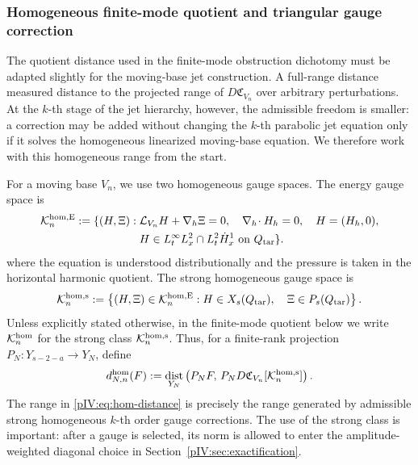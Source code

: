 \documentclass[11pt]{article}
\numberwithin{equation}{section}
\theoremstyle{plain}
\theoremstyle{definition}
\theoremstyle{remark}
\DeclareMathOperator{\dist}{dist}
\newcommand{\nabh}{\nabla_h}
\newcommand{\divh}{\nabla_h\!\cdot}
\newcommand{\calC}{\mathfrak C}
\newcommand{\calK}{\mathcal K}
\begin{document}
\subsubsection{Homogeneous finite-mode quotient and triangular gauge correction}
\label{pIV:subsec:homogeneous-range-gauge}

The quotient distance used in the finite-mode obstruction dichotomy must be adapted
slightly for the moving-base jet construction.  A full-range distance measured distance to
the projected range of \(D\calC_{V_n}\) over arbitrary perturbations.  At the
\(k\)-th stage of the jet hierarchy, however, the admissible freedom is smaller: a
correction may be added without changing the \(k\)-th parabolic jet equation only if
it solves the homogeneous linearized moving-base equation.  We therefore work with
this homogeneous range from the start.

For a moving base \(V_n\), we use two homogeneous gauge spaces.  The energy gauge
space is
\begin{equation}\label{pIV:eq:hom-gauge-energy-space}
\begin{aligned}
        \calK^{\rm hom,E}_n
        :=
        \{(H,\Xi):\;&
        \mathcal L_{V_n}H+\nabh\Xi=0,
        \quad \divh H_h=0,
        \quad H=(H_h,0),\\
        &H\in L^\infty_tL^2_x\cap L^2_t\dot H^1_x
        \text{ on }Q_{\rm tar}\}.
\end{aligned}
\end{equation}
where the equation is understood distributionally and the pressure is taken in the
horizontal harmonic quotient.  The strong homogeneous gauge space is
\begin{equation}\label{pIV:eq:hom-gauge-strong-space}
        \calK^{\rm hom,s}_n
        :=
        \left\{
        (H,\Xi)\in \calK^{\rm hom,E}_n:
        H\in X_s(Q_{\rm tar}),\quad \Xi\in P_s(Q_{\rm tar})
        \right\}.
\end{equation}
Unless explicitly stated otherwise, in the finite-mode quotient below we write
\(\calK^{\rm hom}_n\) for the strong class \(\calK^{\rm hom,s}_n\).  Thus, for a
finite-rank projection \(P_N:Y_{s-2-a}\to Y_N\), define
\begin{equation}\label{pIV:eq:hom-distance}
        d^{\rm hom}_{N,n}(F)
        :=
        \dist_{Y_N}
        \left(
        P_NF,\,
        P_ND\calC_{V_n}[\calK^{\rm hom,s}_n]
        \right).
\end{equation}
The range in \eqref{pIV:eq:hom-distance} is precisely the range generated by admissible
strong homogeneous \(k\)-th order gauge corrections.  The use of the strong class is
important: after a gauge is selected, its norm is allowed to enter the
amplitude-weighted diagonal choice in Section~\ref{pIV:sec:exactification}.
\end{document}
